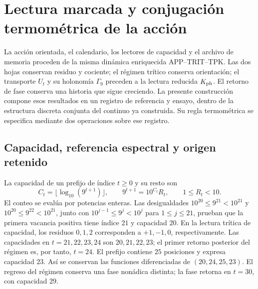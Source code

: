 \section{Lectura marcada y conjugación termométrica de la acción}
\label{md:r27:termica}

La acción orientada, el calendario, los lectores de capacidad y el archivo de
memoria proceden de la misma dinámica enriquecida APP--TRIT--TPK. Las dos hojas
conservan residuo y cociente; el régimen trítico conserva orientación; el
transporte $U_t$ y su holonomía $\Gamma_9$ preceden a la lectura reducida
$K_{\rm ph}$. El retorno de fase conserva una historia que sigue creciendo.
La presente construcción compone esos resultados en un registro de referencia
y ensayo, dentro de la estructura discreta conjunta del continuo ya construida.
Su regla termométrica se especifica mediante dos operaciones sobre ese registro.

\subsection{Capacidad, referencia espectral y origen retenido}
\label{md:r27:capacidad}
La capacidad de un prefijo de índice $t\ge0$ y su resto son
\begin{equation}
 C_t=\lfloor\log_{10}(9^{t+1})\rfloor,\qquad
 9^{t+1}=10^{C_t}R_t,\qquad 1\le R_t<10.
 \label{md:r27:capacidad-resto}
\end{equation}
El conteo se evalúa por potencias enteras. Las desigualdades
$10^{20}\le9^{21}<10^{21}$ y $10^{20}\le9^{22}<10^{21}$,
junto con $10^{j-1}\le9^j<10^j$ para $1\le j\le21$, prueban que
la primera vacancia positiva tiene índice $21$ y capacidad $20$.
En la lectura trítica de capacidad, los residuos $0,1,2$ corresponden a
$+1,-1,0$, respectivamente. Las capacidades en $t=21,22,23,24$ son
$20,21,22,23$; el primer retorno posterior del régimen es, por tanto,
$t=24$. El prefijo contiene $25$ posiciones y expresa capacidad $23$.
Así se conservan las funciones diferenciadas de $(20,24,25,23)$.
El regreso del régimen conserva una fase nonádica distinta; la fase retorna
en $t=30$, con capacidad $29$.

